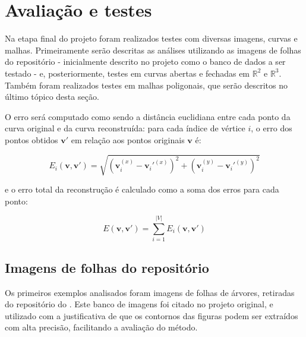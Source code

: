\section{Avaliação e testes}\label{sec:avaliacao}

Na etapa final do projeto foram realizados testes com diversas imagens, curvas e malhas. Primeiramente serão descritas as análises utilizando as imagens de folhas do repositório  - inicialmente descrito no projeto como o banco de dados a ser testado - e, posteriormente, testes em curvas abertas e fechadas em $\mathbb{R}^2$ e $\mathbb{R}^3$. Também foram realizados testes em malhas poligonais, que serão descritos no último tópico desta seção.

O erro será computado como sendo a distância euclidiana entre cada ponto da curva original e da curva reconstruída: para cada índice de vértice $i$, o erro dos pontos obtidos $\mathbf{v'}$ em relação aos pontos originais $\mathbf{v}$ é:

$$E_i(\mathbf{v, v'}) = \sqrt{(\mathbf v_i^{(x)} - \mathbf v_i'^{(x)})^2 + (\mathbf v_i^{(y)} - \mathbf v_i'^{(y)})^2}$$

\noindent e o erro total da reconstrução é calculado como a soma dos erros para cada ponto:

$$E(\mathbf{v, v'}) = \sum_{i = 1}^{|V|}E_i(\mathbf{v, v'})$$

\subsection{Imagens de folhas do repositório }

Os primeiros exemplos analisados foram imagens de folhas de árvores, retiradas do repositório do . Este banco de imagens foi citado no projeto original, e utilizado com a justificativa de que os contornos das figuras podem ser extraídos com alta precisão, facilitando a avaliação do método.


